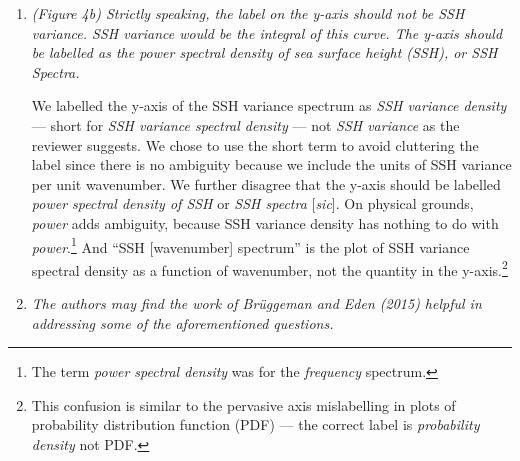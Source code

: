 \documentclass[11pt]{article}
\newcommand{\bdp}{\begin{description}}
\newcommand{\edp}{\end{description}}
\begin{document}
\begin{enumerate}
\item {\it (Figure 4b) Strictly speaking, the label on the y-axis should not be SSH variance. SSH
      variance would be the integral of this curve. The y-axis should be labelled as the
      power spectral density of sea surface height (SSH), or SSH Spectra.}\\

      \bdp
      We labelled the y-axis of the SSH variance spectrum as \textit{SSH variance density}
      --- short for \textit{SSH variance spectral density} --- not \textit{SSH variance} as the reviewer
      suggests.  We chose to use the short term to avoid cluttering the label
      since there is no ambiguity because we include the
      units of SSH variance per unit wavenumber.
      We further disagree that the y-axis should be labelled \textit{power spectral density of SSH}
      or \textit{SSH spectra} [{\it sic}]. On physical grounds, \textit{power} adds ambiguity,
      because SSH variance density has nothing to do with \textit{power}.\footnote{The
      term \textit{power spectral density} was for the \textit{frequency} spectrum.}
      And ``SSH [wavenumber] spectrum'' is the plot of SSH variance spectral density
      as a function of wavenumber, not the quantity in the y-axis.\footnote{This confusion is similar
      to the pervasive axis mislabelling in plots of probability distribution function (PDF)
      --- the correct label is \textit{probability density}
      not PDF.}
      \edp



\item {\it The authors may find the work of Brüggeman and Eden (2015) helpful in addressing
      some of the aforementioned questions.}

\end{enumerate}
\end{document}
